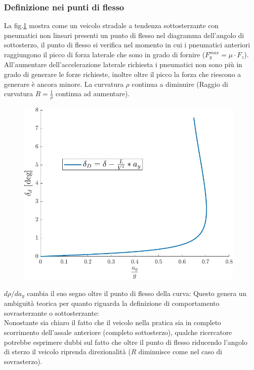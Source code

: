 \subsubsection{Definizione nei punti di flesso}
La fig.\ref{fig:Sterzo Dinamico} mostra come un veicolo stradale a tendenza sottosterzante con pneumatici non lineari 
presenti un punto di flesso nel diagramma dell'angolo di sottosterzo, il punto di flesso si verifica nel momento in cui i 
pneumatici anteriori raggiungono il picco di forza laterale che sono in grado di fornire ($F_y^{max} = \mu \cdot F_z$).
All'aumentare dell'accelerazione laterale richiesta i pneumatici non sono più in grado di generare
le forze richieste, inoltre oltre il picco la forza che riescono a generare è ancora minore.
La curvatura $\rho$ continua a diminuire (Raggio di curvatura $R = \frac{1}{\rho}$ continua ad
aumentare).\\
\begin{figure}[!h]
    \centering
    \includegraphics[scale=0.4]{Immagini/Understeer Gradient/Sterzo dinamico cinesi.jpg}
    \caption{}
    \label{fig:Sterzo Dinamico}
\end{figure}
$d\rho/da_y$ cambia il suo segno oltre il punto di flesso della curva:
Questo genera un ambiguità teorica per quanto riguarda la definizione di comportamento sovrasterzante o sottosterzante:\\
Nonostante sia chiaro il fatto che il veicolo nella pratica sia in completo scorrimento dell'assale anteriore
(completo sottosterzo), qualche ricercatore potrebbe esprimere dubbi sul fatto che oltre il punto di flesso riducendo
l'angolo di sterzo il veicolo riprenda direzionalità ($R$ diminuisce come nel caso di sovrasterzo).


